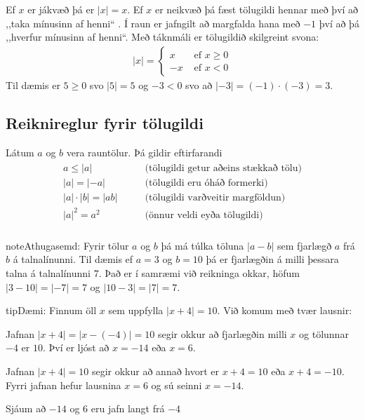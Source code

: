 \documentclass[a4paper,10pt,icelandic]{sphinxmanual}
\begin{document}
Ef \(x\) er jákvæð þá er \(|x|=x\). Ef \(x\) er neikvæð þá fæst tölugildi hennar með því að ,,taka mínusinn af henni“ . Í raun er jafngilt að margfalda hana með  \(-1\) því að þá ,,hverfur mínusinn af henni“. Með táknmáli er tölugildið skilgreint svona:
\begin{equation*}
\begin{split}|x|= \begin{cases} x & \text{ ef } x \geq 0 \\ -x  & \text{ ef } x < 0 \end{cases}\end{split}
\end{equation*}
Til dæmis er \(5 \geq 0\) svo \(|5|=5\) og \(-3 <0\) svo að \(|-3|=(-1) \cdot (-3) = 3\).


\subsection{Reiknireglur fyrir tölugildi}
\label{\detokenize{Kafli02:reiknireglur-fyrir-tolugildi}}
Látum \(a\) og \(b\) vera rauntölur. Þá gildir eftirfarandi
\begin{equation*}
\begin{split}\begin{aligned}
        a \leq |a|  \qquad & \text{(tölugildi getur aðeins stækkað tölu)}\\
        |a|=|-a|  \qquad & \text{(tölugildi eru óháð formerki)}\\
        |a|\cdot|b|=|ab| \qquad & \text{(tölugildi varðveitir margföldun)}\\
        |a|^2=a^2 \qquad  & \text{(önnur veldi eyða tölugildi)}\\
\end{aligned}\end{split}
\end{equation*}
\begin{sphinxadmonition}{note}{Athugasemd:}
Fyrir tölur \(a\) og \(b\) þá má túlka töluna \(|a-b|\) sem fjarlægð \(a\) frá \(b\) á talnalínunni. Til dæmis ef \(a=3\) og \(b=10\) þá er fjarlægðin á milli þessara talna á talnalínunni \(7\). Það er í samræmi við reikninga okkar, höfum \(|3-10|=|-7|=7\) og \(|10-3|=|7|=7\).
\end{sphinxadmonition}

\begin{sphinxadmonition}{tip}{Dæmi:}
Finnum öll \(x\) sem uppfylla \(|x+4|=10\).
Við komum með tvær lausnir:

 Jafnan \(|x+4|=|x-(-4)|=10\) segir okkur að fjarlægðin milli \(x\) og tölunnar \(-4\) er \(10\). Því er ljóst að \(x=-14\) eða \(x=6\).

 Jafnan \(|x+4|=10\) segir okkur að annað hvort er \(x+4=10\) eða \(x+4=-10\). Fyrri jafnan hefur lausnina \(x=6\) og sú seinni \(x=-14\).


Sjáum að \(-14\) og \(6\) eru jafn langt frá \(-4\)
\end{sphinxadmonition}
\end{document}
